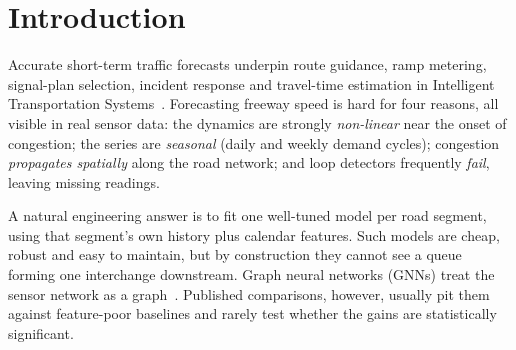 \section{Introduction}
Accurate short-term traffic forecasts underpin route guidance, ramp metering,
signal-plan selection, incident response and travel-time estimation in Intelligent
Transportation Systems~\cite{vlahogianni2014}. Forecasting freeway speed is hard
for four reasons, all visible in real sensor data: the dynamics are strongly
\emph{non-linear} near the onset of congestion; the series are \emph{seasonal}
(daily and weekly demand cycles); congestion \emph{propagates spatially} along the
road network; and loop detectors frequently \emph{fail}, leaving missing readings.

A natural engineering answer is to fit one well-tuned model per road segment, using
that segment's own history plus calendar features. Such models are cheap, robust and
easy to maintain, but by construction they cannot see a queue forming one
interchange downstream. Graph neural networks (GNNs) treat the sensor network as a
graph~\cite{li2018dcrnn,yu2018stgcn,wu2019gwnet}. Published comparisons, however,
usually pit them against feature-poor baselines and rarely test whether the gains
are statistically significant.

